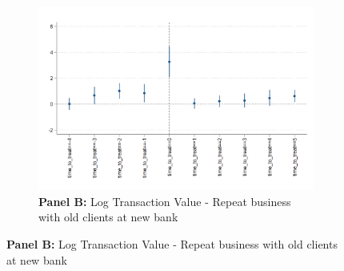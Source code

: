 \begin{figure}[H]
\captionsetup[subfigure]{justification=centering}
	{\small {} \\ ~ \newline}
	\begin{subfigure}[H]{\textwidth}
		\centering
		\caption*{\textbf{Panel B:} Log Transaction Value - Repeat business with old clients at new bank}
		\includegraphics[angle=0,  scale=0.3]{figures/dynamics_logdealsize_repeat.png}
	\end{subfigure}
\end{figure}

